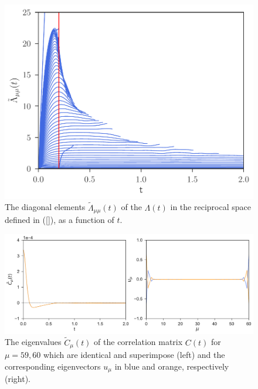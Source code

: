 \documentclass[a4paper,openright,12pt]{book}
\begin{document}
\begin{figure}[h!]
  \centering
\includegraphics[scale=0.45]{LambdatRec-WALLS-66nodes}
\caption[Diagonal elements  $\tilde{\Lambda}_{\mu\mu}(t)$ of $\Lambda(t)$ in the reciprocal space - 66nodes.]{The  diagonal elements  $\tilde{\Lambda}_{\mu\mu}(t)$ of  the
  $\Lambda(t)$ in the reciprocal space defined in (\ref{}), as a
  function of $t$.}
\label{fig:LambdatRec-WALLS-66nodes}
\end{figure}


\begin{figure}[h!]
  \centering
\includegraphics[scale=0.45]{EigenvaluesVectors-WALLS-66nodes}
\caption[Eigenvalues and eigenvectors near the walls for 66 nodes.]{The eigenvalues $\tilde{C}_{\mu}(t)$ of the correlation matrix $C(t)$ for $\mu=59,60$ which are identical and superimpose (left) and the corresponding eigenvectors $u_{\mu}$ in blue and orange, respectively (right).}
\label{fig:EigenvaluesVectors-WALLS-66nodes}
\end{figure}
\end{document}
